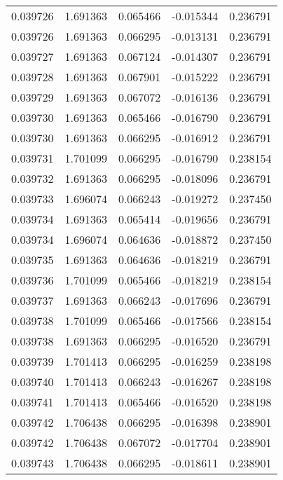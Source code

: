 \begin{tabular}{lrrrr}
0.039726    &  1.691363 &  0.065466 & -0.015344 &             0.236791 \\
0.039726    &  1.691363 &  0.066295 & -0.013131 &             0.236791 \\
0.039727    &  1.691363 &  0.067124 & -0.014307 &             0.236791 \\
0.039728    &  1.691363 &  0.067901 & -0.015222 &             0.236791 \\
0.039729    &  1.691363 &  0.067072 & -0.016136 &             0.236791 \\
0.039730    &  1.691363 &  0.065466 & -0.016790 &             0.236791 \\
0.039730    &  1.691363 &  0.066295 & -0.016912 &             0.236791 \\
0.039731    &  1.701099 &  0.066295 & -0.016790 &             0.238154 \\
0.039732    &  1.691363 &  0.066295 & -0.018096 &             0.236791 \\
0.039733    &  1.696074 &  0.066243 & -0.019272 &             0.237450 \\
0.039734    &  1.691363 &  0.065414 & -0.019656 &             0.236791 \\
0.039734    &  1.696074 &  0.064636 & -0.018872 &             0.237450 \\
0.039735    &  1.691363 &  0.064636 & -0.018219 &             0.236791 \\
0.039736    &  1.701099 &  0.065466 & -0.018219 &             0.238154 \\
0.039737    &  1.691363 &  0.066243 & -0.017696 &             0.236791 \\
0.039738    &  1.701099 &  0.065466 & -0.017566 &             0.238154 \\
0.039738    &  1.691363 &  0.066295 & -0.016520 &             0.236791 \\
0.039739    &  1.701413 &  0.066295 & -0.016259 &             0.238198 \\
0.039740    &  1.701413 &  0.066243 & -0.016267 &             0.238198 \\
0.039741    &  1.701413 &  0.065466 & -0.016520 &             0.238198 \\
0.039742    &  1.706438 &  0.066295 & -0.016398 &             0.238901 \\
0.039742    &  1.706438 &  0.067072 & -0.017704 &             0.238901 \\
0.039743    &  1.706438 &  0.066295 & -0.018611 &             0.238901 \\

\end{tabular}
